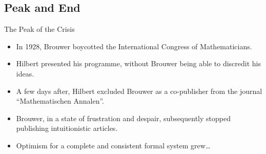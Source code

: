 \documentclass{beamer}
\begin{document}
\subsection{Peak and End}
\begin{frame}{The Peak of the Crisis}
    \begin{itemize}[<+->]
	\item In 1928, Brouwer boycotted the International Congress of Mathematicians.
	\item Hilbert presented his programme, without Brouwer being able to discredit his ideas.
	\item A few days after, Hilbert excluded Brouwer as a co-publisher from the journal ``Mathematischen Annalen''.
	\item Brouwer, in a state of frustration and despair, subsequently stopped publishing intuitionistic articles.
	\item Optimism for a complete and consistent formal system grew\ldots
    \end{itemize}
\end{frame}
\end{document}
